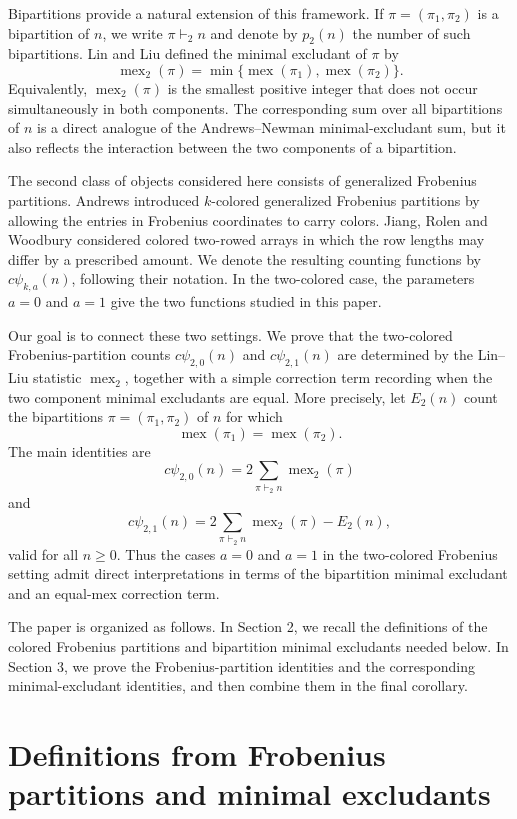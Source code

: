 \documentclass[12pt]{amsart}
\theoremstyle{definition}
\theoremstyle{remark}
\numberwithin{equation}{section}
\newcommand{\mex}{\operatorname{mex}}
\newcommand{\cpsi}{c\psi}
\begin{document}
Bipartitions provide a natural extension of this framework.  If $\pi=(\pi_1,\pi_2)$ is a bipartition of $n$, we write $\pi\vdash_2 n$ and denote by $p_2(n)$ the number of such bipartitions.  Lin and Liu \cite{LinLiu} defined the minimal excludant of $\pi$ by
\[
\mex_2(\pi)=\min\{\mex(\pi_1),\mex(\pi_2)\}.
\]
Equivalently, $\mex_2(\pi)$ is the smallest positive integer that does not occur simultaneously in both components.  The corresponding sum over all bipartitions of $n$ is a direct analogue of the Andrews--Newman minimal-excludant sum, but it also reflects the interaction between the two components of a bipartition.

The second class of objects considered here consists of generalized Frobenius partitions.  Andrews \cite{AndrewsGFP} introduced $k$-colored generalized Frobenius partitions by allowing the entries in Frobenius coordinates to carry colors.  Jiang, Rolen and Woodbury \cite{JiangRolenWoodbury} considered colored two-rowed arrays in which the row lengths may differ by a prescribed amount.  We denote the resulting counting functions by $\cpsi_{k,a}(n)$, following their notation.  In the two-colored case, the parameters $a=0$ and $a=1$ give the two functions studied in this paper.

Our goal is to connect these two settings.  We prove that the two-colored Frobenius-partition counts $\cpsi_{2,0}(n)$ and $\cpsi_{2,1}(n)$ are determined by the Lin--Liu statistic $\mex_2$, together with a simple correction term recording when the two component minimal excludants are equal.  More precisely, let $E_2(n)$ count the bipartitions $\pi=(\pi_1,\pi_2)$ of $n$ for which
\[
\mex(\pi_1)=\mex(\pi_2).
\]
The main identities are
\[
\cpsi_{2,0}(n)=2\sum_{\pi\vdash_2 n}\mex_2(\pi)
\]
and
\[
\cpsi_{2,1}(n)=2\sum_{\pi\vdash_2 n}\mex_2(\pi)-E_2(n),
\]
valid for all $n\geq 0$.  Thus the cases $a=0$ and $a=1$ in the two-colored Frobenius setting admit direct interpretations in terms of the bipartition minimal excludant and an equal-mex correction term.

The paper is organized as follows.  In Section 2, we recall the definitions of the colored Frobenius partitions and bipartition minimal excludants needed below.  In Section 3, we prove the Frobenius-partition identities and the corresponding minimal-excludant identities, and then combine them in the final corollary.

\section{Definitions from Frobenius partitions and minimal excludants}
\end{document}
